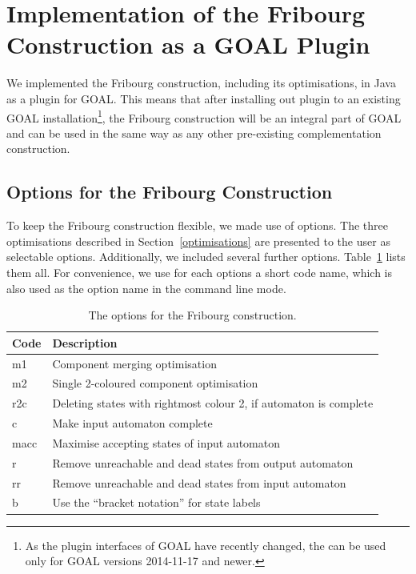 \section{Implementation of the Fribourg Construction as a GOAL Plugin}
\label{implementation}
We implemented the Fribourg construction, including its optimisations, in Java as a plugin for GOAL. This means that after installing out plugin to an existing GOAL installation\footnote{As the plugin interfaces of GOAL have recently changed, the can be used only for GOAL versions 2014-11-17 and newer.}, the Fribourg construction will be an integral part of GOAL and can be used in the same way as any other pre-existing complementation construction.

\subsection{Options for the Fribourg Construction}
To keep the Fribourg construction flexible, we made use of options. The three optimisations described in Section~\ref{optimisations} are presented to the user as selectable options. Additionally, we included several further options. Table~\ref{goal_fribourg_options} lists them all. For convenience, we use for each options a short code name, which is also used as the option name in the command line mode.

\begin{table}
\caption{The options for the Fribourg construction.}
\begin{center}
\begin{tabular}{|l|l|}
\hline
Code & Description \\ \hline
m1 & Component merging optimisation \\ \hline
m2 & Single 2-coloured component optimisation \\ \hline
r2c & Deleting states with rightmost colour 2, if automaton is complete \\ \hline
c & Make input automaton complete \\ \hline
macc & Maximise accepting states of input automaton \\ \hline
r & Remove unreachable and dead states from output automaton \\ \hline
rr & Remove unreachable and dead states from input automaton \\ \hline
b & Use the ``bracket notation'' for state labels \\ \hline
\end{tabular}
\end{center}
\label{goal_fribourg_options}
\end{table}


